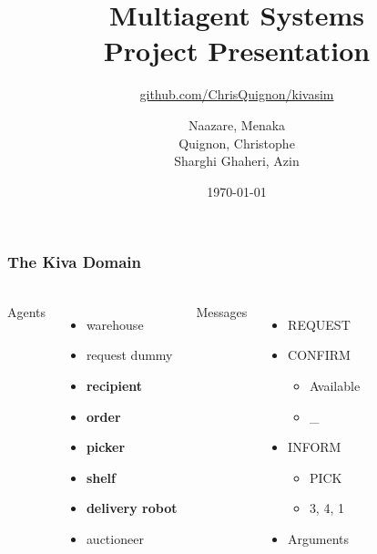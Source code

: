 \documentclass{beamer}
\begin{document}
\title{Multiagent Systems\\
Project Presentation}
\subtitle{\bigskip
\href{https://github.com/ChrisQuignon/kivasim}{github.com/ChrisQuignon/kivasim}}
\author{
Naazare, Menaka \\
Quignon, Christophe \\
Sharghi  Ghaheri, Azin \\
} 
\date{\today}

\begin{frame}
\titlepage{}
\end{frame}


\begin{frame}[fragile]
\frametitle{The Kiva Domain}
\framesubtitle{}

\begin{columns}[t,onlytextwidth]
Agents
\begin{itemize}
\item warehouse
\item request dummy
\item \textbf{recipient}
\item \textbf{order}
\item \textbf{picker}
\item \textbf{shelf}
\item \textbf{delivery robot}
\item auctioneer
\end{itemize}

Messages
\begin{itemize}
\item REQUEST
\item CONFIRM
\begin{itemize}
	\item Available
	\item \_
\end{itemize}

\item INFORM
	\begin{itemize}
	\item PICK 
	\item 3, 4, 1
	\end{itemize}
\item Arguments
\end{itemize}

\end{columns}

\end{frame}
\end{document}

